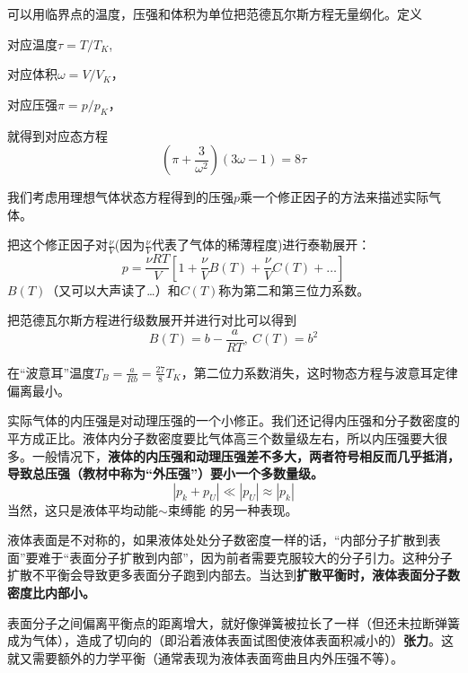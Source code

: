 \documentclass[CJK]{beamer}
\begin{document}
\begin{frame}
\bch
可以用临界点的温度，压强和体积为单位把范德瓦尔斯方程无量纲化。定义

对应温度$\tau = T/T_K$, 

对应体积$\omega = V/V_K$，

对应压强$\pi = p/p_K$，

就得到对应态方程
$$\left(\pi + \frac{3}{\omega^2} \right)(3\omega - 1) = 8\tau$$

\ech
\end{frame}

\begin{frame}
\bch
我们考虑用理想气体状态方程得到的压强$p$乘一个修正因子的方法来描述实际气体。

把这个修正因子对$\frac{\nu}{V}$(因为$\frac{\nu}{V}$代表了气体的稀薄程度)进行泰勒展开：
$$p = \frac{\nu RT}{V}\left[1+ \frac{\nu}{V}B(T) + \frac{\nu}{V}C(T) + \ldots \right]$$
$B(T)$（又可以大声读了…）和$C(T)$称为第二和第三位力系数。

\skipline

把范德瓦尔斯方程进行级数展开并进行对比可以得到
$$B(T) = b - \frac{a}{RT}, \ C(T) = b^2$$

在“波意耳”温度$T_B = \frac{a}{Rb} = \frac{27}{8}T_K$，第二位力系数消失，这时物态方程与波意耳定律偏离最小。
\ech
\end{frame}



\begin{frame}
\bch
实际气体的内压强是对动理压强的一个小修正。我们还记得内压强和分子数密度的平方成正比。液体内分子数密度要比气体高三个数量级左右，所以内压强要大很多。一般情况下，{\bf 液体的内压强和动理压强差不多大，两者符号相反而几乎抵消，导致总压强（教材中称为“外压强”）要小一个多数量级。}
$$ |p_k + p_U| \ll |p_U|\approx |p_k|$$
当然，这只是液体平均动能$\sim$束缚能 的另一种表现。
\ech
\end{frame}

\begin{frame}
\bch
 液体表面是不对称的，如果液体处处分子数密度一样的话，“内部分子扩散到表面”要难于“表面分子扩散到内部”，因为前者需要克服较大的分子引力。这种分子扩散不平衡会导致更多表面分子跑到内部去。当达到{\bf 扩散平衡时，液体表面分子数密度比内部小。} 

\skipline

表面分子之间偏离平衡点的距离增大，就好像弹簧被拉长了一样（但还未拉断弹簧成为气体），造成了切向的（即沿着液体表面试图使液体表面积减小的）{\bf 张力}。这就又需要额外的力学平衡（通常表现为液体表面弯曲且内外压强不等）。

\ech
\end{frame}
\end{document}

